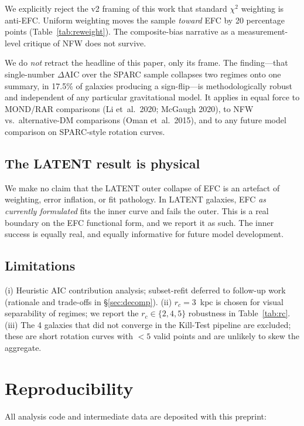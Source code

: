 \documentclass[11pt,a4paper]{article}
\begin{document}
We explicitly reject the v2 framing of this work that standard
$\chi^2$ weighting is anti-EFC.  Uniform weighting moves the sample
{\em toward} EFC by 20 percentage points (Table~\ref{tab:reweight}).
The composite-bias narrative as a measurement-level critique of NFW does
not survive.

We do {\em not} retract the headline of this paper, only its frame.  The
finding---that single-number $\Delta\text{AIC}$ over the SPARC sample
collapses two regimes onto one summary, in 17.5\% of galaxies producing
a sign-flip---is methodologically robust and independent of any
particular gravitational model.  It applies in equal force to MOND/RAR
comparisons (Li et~al.\ 2020; McGaugh 2020), to NFW vs.\ alternative-DM
comparisons (Oman et~al.\ 2015), and to any future model comparison on
SPARC-style rotation curves.

\subsection{The LATENT result is physical}

We make no claim that the LATENT outer collapse of EFC is an artefact of
weighting, error inflation, or fit pathology.  In LATENT galaxies, EFC
{\em as currently formulated} fits the inner curve and fails the outer.
This is a real boundary on the EFC functional form, and we report it as
such.  The inner success is equally real, and equally informative for
future model development.

\subsection{Limitations}

(i) Heuristic AIC contribution analysis; subset-refit deferred to
follow-up work (rationale and trade-offs in \S\ref{sec:decomp}).
(ii) $r_c=3$~kpc is chosen for visual separability of regimes; we
report the $r_c\in\{2,4,5\}$ robustness in Table~\ref{tab:rc}.
(iii) The 4 galaxies that did not converge in the Kill-Test pipeline
are excluded; these are short rotation curves with $<5$ valid points
and are unlikely to skew the aggregate.

\section{Reproducibility}
\label{sec:repro}

All analysis code and intermediate data are deposited with this preprint:
\end{document}
